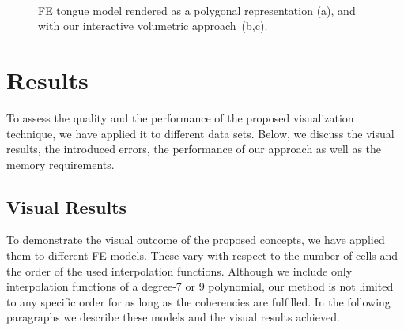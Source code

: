 \documentclass[journal]{vgtc}                %
\begin{document}
\begin{figure}
    \centering 
    \\
    \caption{FE tongue model rendered as a polygonal representation (a), and with our interactive volumetric approach~(b,c).}
    \label{fig:tongue}
\end{figure}
%
%
%
\section{Results}\label{sec:results}
To assess the quality and the performance of the proposed visualization technique, we have applied it to different data sets. Below, we discuss the visual results, the introduced errors, the performance of our approach as well as the memory requirements.
%
%
%
\subsection{Visual Results}
To demonstrate the visual outcome of the proposed concepts, we have applied them to different FE models. These vary with respect to the number of cells and the order of the used interpolation functions. Although we include only interpolation functions of a degree-7 or 9 polynomial, our method is not limited to any specific order for as long as the coherencies are fulfilled. In the following paragraphs we describe these models and the visual results achieved.
\end{document}
